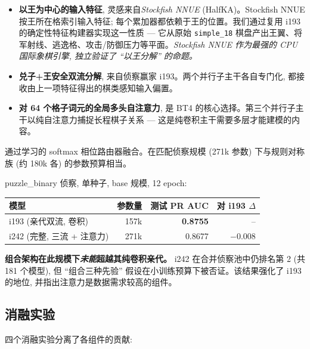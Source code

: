 \documentclass[10pt,a4paper]{article}
\begin{document}
\begin{itemize}
\item \textbf{以王为中心的输入特征}, 灵感来自\textit{Stockfish NNUE} (HalfKA)。Stockfish NNUE 按王所在格索引输入特征; 每个累加器都依赖于王的位置。我们通过复用 i193 的确定性特征构建器实现这一性质 --- 它从原始 \texttt{simple\_18} 棋盘产出王翼、将军射线、逃逸格、攻击/防御压力等平面。\textit{Stockfish NNUE 作为最强的 CPU 国际象棋引擎, 独立验证了 “以王分解” 的命题。}
\item \textbf{兑子+王安全双流分解}, 来自侦察赢家 i193。两个并行子主干各自专门化, 都接收由上一项特征得出的棋类感知输入偏置。
\item \textbf{对 64 个格子词元的全局多头自注意力}, 是 BT4 的核心选择。第三个并行子主干以纯自注意力捕捉长程棋子关系 --- 这是纯卷积主干需要多层才能建模的内容。
\end{itemize}

通过学习的 softmax 相位路由器融合。在匹配侦察规模 (271k 参数) 下与规则对称族 (约 180k 各) 的参数预算相当。

\begin{tcolorbox}[callout, title=结果 --- i242 对 i193]
puzzle\_binary 侦察, 单种子, base 规模, 12 epoch:

\begin{footnotesize}
\begin{tabularx}{\linewidth}{@{}L r r r@{}}
\toprule
\textbf{模型} & \textbf{参数量} & \textbf{测试 PR AUC} & \textbf{对 i193 $\Delta$} \\
\midrule
i193 (亲代双流, 卷积) & 157k & \textbf{0.8755} & -- \\
i242 (完整, 三流 + 注意力) & 271k & 0.8677 & $-0.008$ \\
\bottomrule
\end{tabularx}
\end{footnotesize}

\textbf{组合架构在此规模下\emph{未能}超越其纯卷积亲代。} i242 在合并侦察池中仍排名第 2 (共 181 个模型), 但 “组合三种先验” 假设在小训练预算下被否证。该结果强化了 i193 的地位, 并指出注意力是数据需求较高的组件。
\end{tcolorbox}

\subsection{消融实验}

四个消融实验分离了各组件的贡献:
\end{document}
